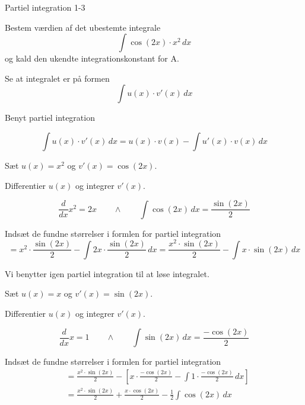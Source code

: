 \documentclass{article}
\begin{document}
\newpage

\begin{exercise}{Partiel integration 1-3}
	
	
	Bestem værdien af det ubestemte integrale
	\[
	\int \cos(2x) \cdot x^2 \, dx
	\]
	og kald den ukendte integrationskonstant for A.
	
	
	
	\hint
	
	Se at integralet er på formen
	\[
	\int u(x) \cdot v'(x) \, dx
	\]
	
	\hint
	
	Benyt partiel integration
	
	\hint
	\[
	\int u(x) \cdot v'(x)\, dx = u(x) \cdot v(x) - \int u'(x) \cdot v(x) \, dx
	\]
	\hint
	
	Sæt $u(x) = x^2$ og $v'(x) = \cos(2x)$.
	
	
	\hint
	
	Differentier $u(x)$ og integrer $v'(x)$.
	
	\hint
	\[
	\frac{d}{dx}x^2 = 2x \qquad \wedge \qquad \int \cos(2x) \, dx = \frac{\sin(2x)}{2}
	\]
	
	\hint
	
	Indsæt de fundne størrelser i formlen for partiel integration
	\[
	= x^2 \cdot  \frac{\sin(2x)}{2} - \int 2x \cdot  \frac{\sin(2x)}{2} \, dx = \frac{x^2 \cdot \sin(2x)}{2} - \int x \cdot \sin(2x) \, dx 
	\]
	
	\hint
	
	Vi benytter igen partiel integration til at løse integralet.
	
	\hint
	
	Sæt $u(x) = x$ og $v'(x) = \sin(2x)$.
	
	
	\hint
	
	Differentier $u(x)$ og integrer $v'(x)$.
	
	\hint
	\[
	\frac{d}{dx}x = 1 \qquad \wedge \qquad \int \sin(2x) \, dx = \frac{-\cos(2x)}{2}
	\]
	
	\hint
	
	Indsæt de fundne størrelser i formlen for partiel integration
	\begin{align*}
	&= \frac{x^2 \cdot \sin(2x)}{2} - \left[ x \cdot \frac{-\cos(2x)}{2} - \int 1 \cdot \frac{-\cos(2x)}{2} \, dx \right] \\
	&= \frac{x^2 \cdot \sin(2x)}{2} +  \frac{x \cdot \cos(2x)}{2} -  \frac{1}{2}\int \cos(2x)\, dx
	\end{align*}
	

\end{exercise}
\end{document}
